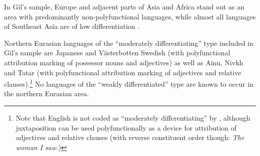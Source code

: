 In Gil's sample, Europe and adjacent parts of Asia and Africa stand out as an area with predominantly non-polyfunctional languages, while almost all languages of Southeast Asia are of low differentiation \citep[8]{gil2005}.

Northern Eurasian languages of the “moderately differentiating” type included in Gil's sample are Japanese and Västerbotten Swedish (with polyfunctional attribution marking of possessor nouns and adjectives) as well as Ainu, Nivkh and Tatar (with polyfunctional attribution marking of adjectives and relative clauses).\footnote{Note that English is not coded as “moderately differentiating” by \citet{gil2005}, although juxtaposition can be used polyfunctionally as a device for attribution of adjectives and relative clauses (with reverse constituent order though: \textit{The woman I saw.})} No languages of the “weakly differentiated” type are known to occur in the northern Eurasian area. 
